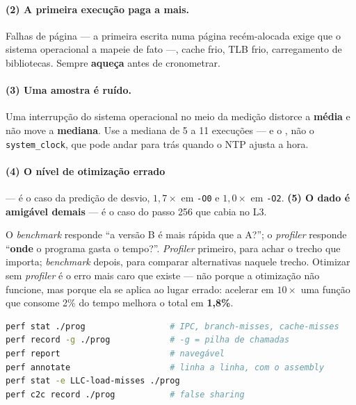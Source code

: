 \paragraph{(2) A primeira execução paga a mais.} Falhas de página --- a primeira
escrita numa página recém-alocada exige que o sistema operacional a mapeie de fato
---, cache frio, TLB frio, carregamento de bibliotecas. Sempre \textbf{aqueça}
antes de cronometrar.

\paragraph{(3) Uma amostra é ruído.} Uma interrupção do sistema operacional no
meio da medição distorce a \textbf{média} e não move a \textbf{mediana}. Use a
mediana de 5 a 11 execuções --- e o , não o
\texttt{system\_clock}, que pode andar para trás quando o NTP ajusta a hora.

\paragraph{(4) O nível de otimização errado} --- é o caso da predição de desvio,
$1{,}7\times$ em \texttt{-O0} e $1{,}0\times$ em \texttt{-O2}.
\textbf{(5) O dado é amigável demais} --- é o caso do passo 256 que cabia no L3.

\begin{regra}
O \emph{benchmark} responde ``a versão B é mais rápida que a A?''; o
\emph{profiler} responde ``\textbf{onde} o programa gasta o tempo?''.
\emph{Profiler} primeiro, para achar o trecho que importa; \emph{benchmark}
depois, para comparar alternativas naquele trecho. Otimizar sem \emph{profiler} é
o erro mais caro que existe --- não porque a otimização não funcione, mas porque
ela se aplica ao lugar errado: acelerar em $10\times$ uma função que consome 2\%
do tempo melhora o total em \textbf{1,8\%}.
\end{regra}

\begin{lstlisting}[style=bt, language=bash,
    caption={\texttt{perf}, o mínimo que vale saber.}]
perf stat ./prog                 # IPC, branch-misses, cache-misses
perf record -g ./prog            # -g = pilha de chamadas
perf report                      # navegável
perf annotate                    # linha a linha, com o assembly
perf stat -e LLC-load-misses ./prog
perf c2c record ./prog           # false sharing
\end{lstlisting}

